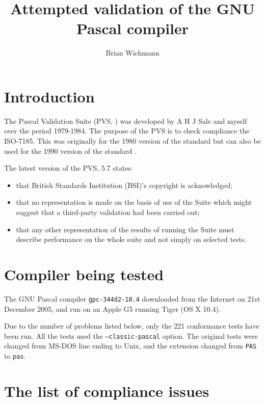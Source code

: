 \documentclass[a4paper]{article}
\title{Attempted validation of the GNU Pascal compiler}
\author{Brian Wichmann}
\begin{document}
\maketitle


\section{Introduction}

The Pascal Validation Suite (PVS, \cite{pvs}) was developed by A H J Sale and myself over the period 1979-1984.
The purpose of the PVS is to check compliance the ISO-7185. This was originally for the 1980
version of the standard but can also be used for the 1990 version of the standard \cite{pascal}.

The latest version of the PVS, 5.7 states:

\begin{itemize}
  \item that British Standards Institution (BSI)'s copyright is acknowledged;

  \item that no representation is made on the basis of use of the Suite which 
    might suggest that a third-party validation had been carried out;

  \item that any other representation of the results of running the Suite must 
    describe performance on the whole suite and not simply on selected tests. 
\end{itemize}

\section{Compiler being tested}

The GNU Pascal compiler \texttt{gpc-344d2-10.4} downloaded from the Internet on 21st December 2005,
and run on an Apple G5 running Tiger (OS X 10.4).

Due to the number of problems listed below, only the 221 conformance tests have been run. All the
tests used the \texttt{--classic-pascal} option. The original tests were changed from MS-DOS
line ending to Unix, and the extension changed from \texttt{PAS} to \texttt{pas}.


\section{The list of compliance issues}
\end{document}
